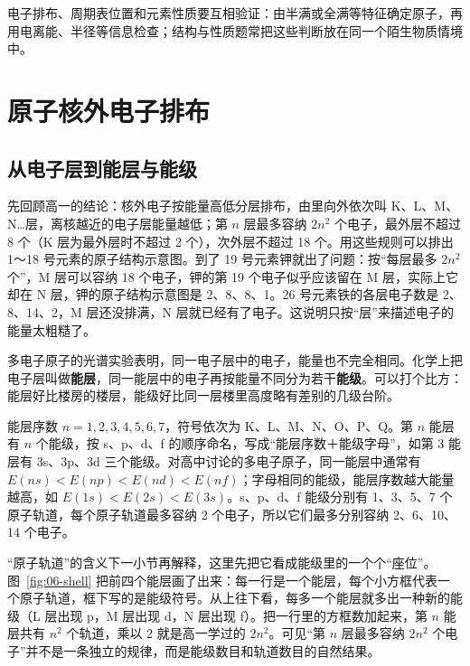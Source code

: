电子排布、周期表位置和元素性质要互相验证：由半满或全满等特征确定原子，再用电离能、半径等信息检查；结构与性质题常把这些判断放在同一个陌生物质情境中。

\section{原子核外电子排布}

\subsection{从电子层到能层与能级}
先回顾高一的结论：核外电子按能量高低分层排布，由里向外依次叫 K、L、M、N…层，离核越近的电子层能量越低；第 $n$ 层最多容纳 $2n^2$ 个电子，最外层不超过 8 个（K 层为最外层时不超过 2 个），次外层不超过 18 个。用这些规则可以排出 1～18 号元素的原子结构示意图。到了 19 号元素钾就出了问题：按“每层最多 $2n^2$ 个”，M 层可以容纳 18 个电子，钾的第 19 个电子似乎应该留在 M 层，实际上它却在 N 层，钾的原子结构示意图是 2、8、8、1。26 号元素铁的各层电子数是 2、8、14、2，M 层还没排满，N 层就已经有了电子。这说明只按“层”来描述电子的能量太粗糙了。

多电子原子的光谱实验表明，同一电子层中的电子，能量也不完全相同。化学上把电子层叫做\textbf{能层}，同一能层中的电子再按能量不同分为若干\textbf{能级}。可以打个比方：能层好比楼房的楼层，能级好比同一层楼里高度略有差别的几级台阶。

\begin{gainian}[能层与能级]
能层序数 $n=1,2,3,4,5,6,7$，符号依次为 K、L、M、N、O、P、Q。第 $n$ 能层有 $n$ 个能级，按 s、p、d、f 的顺序命名，写成“能层序数＋能级字母”，如第 3 能层有 3s、3p、3d 三个能级。对高中讨论的多电子原子，同一能层中通常有 $E(ns)<E(np)<E(nd)<E(nf)$；字母相同的能级，能层序数越大能量越高，如 $E(1s)<E(2s)<E(3s)$。s、p、d、f 能级分别有 1、3、5、7 个原子轨道，每个原子轨道最多容纳 2 个电子，所以它们最多分别容纳 2、6、10、14 个电子。
\end{gainian}

“原子轨道”的含义下一小节再解释，这里先把它看成能级里的一个个“座位”。图~\ref{fig:06-shell} 把前四个能层画了出来：每一行是一个能层，每个小方框代表一个原子轨道，框下写的是能级符号。从上往下看，每多一个能层就多出一种新的能级（L 层出现 p，M 层出现 d，N 层出现 f）。把一行里的方框数加起来，第 $n$ 能层共有 $n^2$ 个轨道，乘以 2 就是高一学过的 $2n^2$。可见“第 $n$ 层最多容纳 $2n^2$ 个电子”并不是一条独立的规律，而是能级数目和轨道数目的自然结果。

